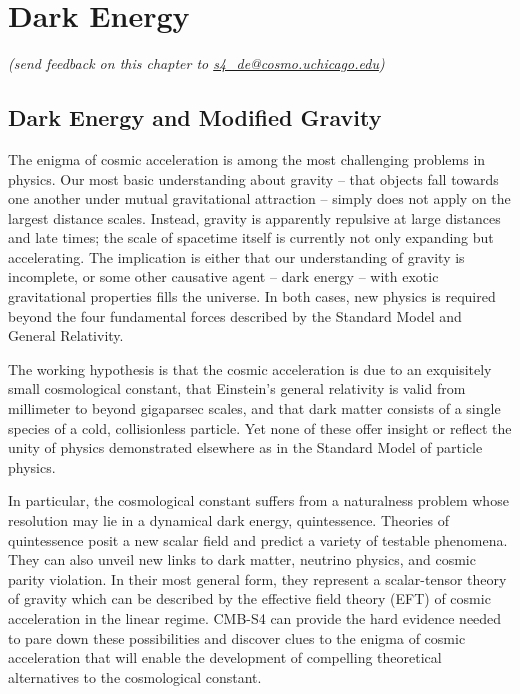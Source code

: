 
\def\gtrsim{\raise-.75ex\hbox{$\buildrel>\over\sim$}}
\def\lsim{\raise-.75ex\hbox{$\buildrel<\over\sim$}}

\chapter{Dark Energy}

\begin{center}
{\small \it (send feedback on this chapter to \href{mailto:s4_de@cosmo.uchicago.edu}{s4\_de@cosmo.uchicago.edu})}
\end{center}

\begin{quotation}



\end{quotation}

\section{Dark Energy and Modified Gravity}


The enigma of cosmic acceleration is among the most challenging problems in physics. Our most basic understanding about gravity -- that objects fall towards one another under mutual gravitational attraction -- simply does not apply on the largest distance scales. Instead, gravity is apparently repulsive at large distances and late times; the scale of spacetime itself is currently not only expanding but accelerating. The implication is either that our understanding of gravity is incomplete, or some other causative agent -- dark energy -- with exotic gravitational properties fills the universe. In both cases, new physics is required beyond the four fundamental forces described by the Standard Model and General Relativity.

The working hypothesis is that the cosmic acceleration is due to an exquisitely small cosmological constant, that Einstein's general relativity is valid from millimeter to beyond gigaparsec scales, and that dark matter consists of a single species of a cold, collisionless particle. Yet none of these offer insight or reflect the unity of physics demonstrated elsewhere as in the Standard Model of particle physics.

In particular, the cosmological constant suffers from a naturalness problem whose resolution may lie in a dynamical dark energy, quintessence. Theories of quintessence posit a new scalar field and predict a variety of testable phenomena.  They can also unveil new links to dark matter, neutrino physics, and cosmic parity violation. In their most general form, they represent
a scalar-tensor theory of gravity which can be described by  the effective field theory (EFT) of cosmic acceleration in the linear regime. 
CMB-S4 can provide the hard evidence  needed to pare down these possibilities and discover clues to the enigma of cosmic acceleration that will enable the development of  compelling theoretical 
alternatives to the cosmological constant.

